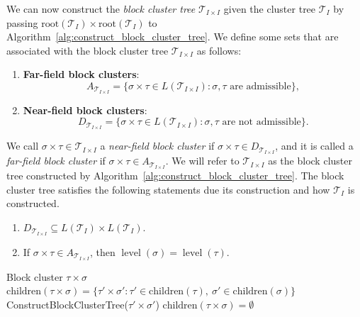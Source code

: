 \documentclass[final,3p,times]{elsarticle}
\newcommand{\mc}[1]{\mathcal{#1}}
\begin{document}
We can now construct the \textit{block cluster tree} $\mc{T}_{I \times I}$ given the cluster tree $\mc{T}_{I}$ by passing $\text{root}(\mc{T}_{I}) \times \text{root}(\mc{T}_{I})$ to Algorithm~\ref{alg:construct_block_cluster_tree}. We  define some sets that are associated with the block cluster tree $\mc{T}_{I \times I}$ as follows:
\begin{enumerate}
    \item \textbf{Far-field block clusters}: $$A_{\mc{T}_{I \times I}} = \{\sigma \times \tau \in L(\mc{T}_{I \times I}): \sigma, \tau  \text{~are admissible} \},$$
    \item \textbf{Near-field block clusters}:   $$D_{\mc{T}_{I \times I}} = \{\sigma \times \tau \in L(\mc{T}_{I \times I}): \sigma, \tau \text{~are not admissible} \}.$$
\end{enumerate}
We call $\sigma \times \tau \in \mc{T}_{I \times I}$ a \emph{near-field block cluster} if 
$\sigma \times \tau \in D_{\mc{T}_{I \times I}}$, and it is called a \emph{far-field block cluster} if 
$\sigma \times \tau \in A_{\mc{T}_{I \times I}}$.
We will refer to $\mc{T}_{I \times I}$ as the block cluster tree constructed by Algorithm~\ref{alg:construct_block_cluster_tree}. The block cluster tree satisfies the following statements due its construction and how $\mc{T}_{I}$ is constructed.
\begin{enumerate}
\item $D_{\mathcal{T}_{I \times I}} \subseteq L(\mathcal{T}_I) \times L(\mathcal{T}_I)$.
\item If $\sigma \times \tau \in A_{\mathcal{T}_{I \times I}}$, then $\operatorname{level}(\sigma) = \operatorname{level}(\tau)$.
\end{enumerate}

\begin{algorithm}[!ht]
\caption{ConstructBlockClusterTree}
\label{alg:construct_block_cluster_tree}
\begin{algorithmic}[1]
\Require Block cluster $\tau \times \sigma$
    \State $\text{children}(\tau \times \sigma) = \{\tau' \times \sigma': \tau' \in \text{children}(\tau),~ \sigma' \in \text{children}(\sigma) \}$
        \State ConstructBlockClusterTree($\tau' \times \sigma'$)
    \EndFor
\Else
    \State $\text{children}(\tau \times \sigma) =\emptyset$
\EndIf
\end{algorithmic}
\end{algorithm}
\end{document}
